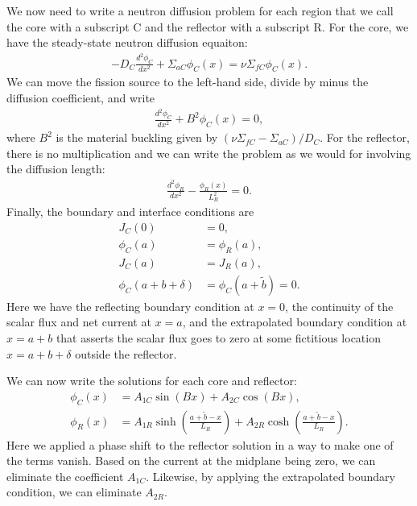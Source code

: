 We now need to write a neutron diffusion problem for each region that we call the core with a subscript C and the reflector with a subscript R. For the core, we have the steady-state neutron diffusion equaiton:
\begin{align}
  -D_C \frac{d^2 \phi_C}{dx^2} + \Sigma_{aC} \phi_C(x) = \nu \Sigma_{fC} \phi_C(x) .
\end{align}
We can move the fission source to the left-hand side, divide by minus the diffusion coefficient, and write
\begin{align}
  \frac{d^2 \phi_C}{dx^2} + B^2 \phi_C(x) = 0,
\end{align}
where $B^2$ is the material buckling given by $(\nu\Sigma_{fC} - \Sigma_{aC})/D_C$. For the reflector, there is no multiplication and we can write the problem as we would for involving the diffusion length:
\begin{align}
  \frac{d^2 \phi_R}{dx^2} - \frac{\phi_R(x)}{L_R^2} = 0 .
\end{align}
Finally, the boundary and interface conditions are
\begin{subequations}
\begin{align}
  J_C(0) &= 0, \\
  \phi_C(a) &= \phi_R(a), \\
  J_C(a) &= J_R(a), \\
  \phi_C(a+b+\delta) &= \phi_C(a+\tilde{b}) = 0.
\end{align}
\end{subequations}
Here we have the reflecting boundary condition at $x = 0$, the continuity of the scalar flux and net current at $x = a$, and the extrapolated boundary condition at $x = a + b$ that asserts the scalar flux goes to zero at some fictitious location $x = a + b + \delta$ outside the reflector.

We can now write the solutions for each core and reflector:
\begin{subequations}
\begin{align}
  \phi_C(x) &= A_{1C} \sin( B x ) + A_{2C} \cos( B x ), \\
  \phi_R(x) &= A_{1R} \sinh\left( \frac{ a + \tilde{b} - x}{L_R} \right) + A_{2R} \cosh\left( \frac{ a + \tilde{b} - x}{L_R} \right).
\end{align}
\end{subequations}
Here we applied a phase shift to the reflector solution in a way to make one of the terms vanish. Based on the current at the midplane being zero, we can eliminate the coefficient $A_{1C}$. Likewise, by applying the extrapolated boundary condition, we can eliminate $A_{2R}$.

